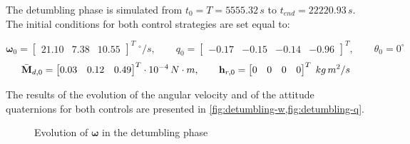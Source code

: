 The detumbling phase is simulated from $t_0 = T = 5555.32 \, s$ to $t_{end} = 22220.93 \, s$. The initial conditions for both control strategies are set equal to:

\begin{equation*}
    \bm{\omega}_0 = \begin{bmatrix}
    21.10 & 7.38 & 10.55
    \end{bmatrix}^T \;
    ^{\circ}/s, \qquad
    q_0 = \begin{bmatrix}
    -0.17 & -0.15 & -0.14 & -0.96
    \end{bmatrix}^T, \qquad
    \theta_0 = 0^{\circ}
\end{equation*}
\begin{equation*}
    \Bar{\mathbf{M}}_{d,0} = \begin{bmatrix}
    0.03 & 0.12 & 0.49
    \end{bmatrix}^T \cdot 10^{-4} \, N \cdot m, \qquad
    \mathbf{h}_{r,0} = \begin{bmatrix}
    0 & 0 & 0 & 0
    \end{bmatrix}^T \; kg \, m^2/s
\end{equation*}

The results of the evolution of the angular velocity and of the attitude quaternions for both controls are presented in \cref{fig:detumbling-w,fig:detumbling-q}.

\begin{figure}[h!]
    \centering
    \caption{Evolution of $\bm{\omega}$ in the detumbling phase}
    \label{fig:detumbling-w}
\end{figure}

